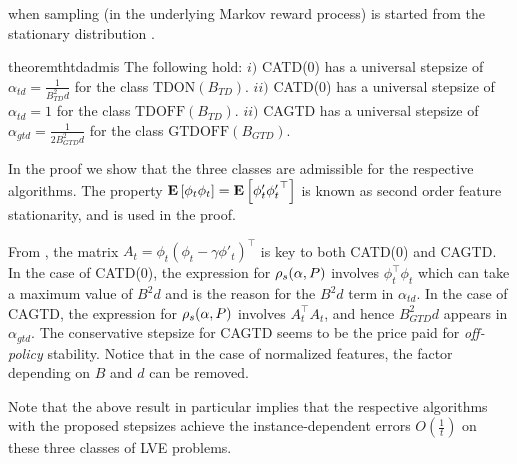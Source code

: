 when sampling (in the underlying Markov reward process) 
is started from the stationary distribution \cite{su88}. 
\FloatBarrier
\begin{table}[h]
\caption{Here, $S,A,\gamma$ are fixed across all the class and the second column shows the quantities that vary across the respective classes. These three capture \emph{on/off-policy} learning scenarios arising in RL.}
\end{table}
\fi
\begin{restatable}{theorem}{thtdadmis}\label{th:tdadmis}
The following hold:
$i)$ CATD(0) has a universal stepsize of $\alpha_{td}=\frac{1}{B^2_{TD}d}$ for  the class $\text{TDON}(B_{TD})$.
$ii)$ CATD(0) has a universal stepsize of $\alpha_{td}=1$ for  the class $\text{TDOFF}(B_{TD})$.
$ii)$ CAGTD has a universal stepsize of $\alpha_{gtd}=\frac{1}{2B^2_{GTD}d}$ for the class $\text{GTDOFF}(B_{GTD})$.
\end{restatable}
In the proof we show that the three classes are admissible for the respective algorithms.
The property $\mathbf{E}\left[\phi_t\phi_t\right]=\mathbf{E}\left[\phi'_t{\phi'_t}^\top\right]$ is known as second order feature stationarity, and is used in the proof.
\fi

From , the matrix $A_t=\phi_t(\phi_t-\gamma\phi'_t)^\top$ is key to both CATD(0) and CAGTD. In the case of CATD(0),  the expression for $\rho_s(\alpha,P)$ involves $\phi^\top_t\phi_t$ which can take a maximum value of $B^2d$  and is the reason for the $B^2d$ term in $\alpha_{td}$. In the case of CAGTD, the expression for $\rho_s(\alpha,P)$ involves $A_t^\top A_t$, and hence $B^2_{GTD}d$ appears in $\alpha_{gtd}$. 
The conservative stepsize for CAGTD seems to be the price paid for \emph{off-policy} stability. Notice that in the case of normalized features, the factor depending on $B$ and $d$ can be removed.

Note that the above result in particular implies that the respective algorithms with the proposed stepsizes achieve the instance-dependent errors $O(\frac{1}{t})$ on these three classes of LVE problems.

